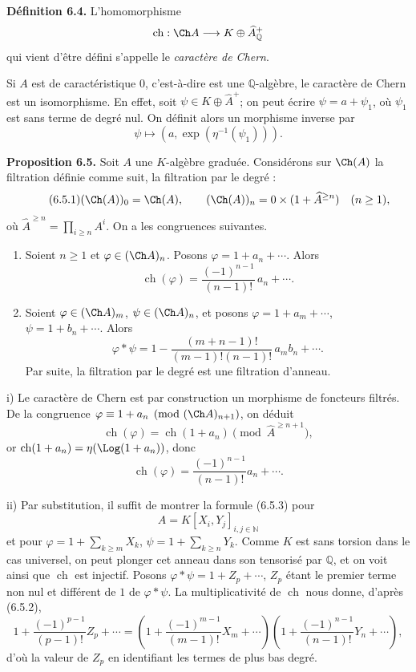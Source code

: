 \documentclass[11pt]{article}
\newcommand{\ch}{\operatorname{ch}}
\providecommand{\ch}{\operatorname{ch}}
\begin{document}
\textbf{Définition 6.4.} L'homomorphisme
\[
  \ch:\Ch A\longrightarrow K\oplus\widehat A_{\mathbb Q}^{+}
\]
qui vient d'être défini s'appelle le \emph{caractère de Chern}.

Si \(A\) est de caractéristique \(0\), c'est-à-dire est une \(\mathbb Q\)-algèbre, le caractère de Chern est un isomorphisme. En effet, soit \(\psi\in K\oplus\widehat A^+\); on peut écrire \(\psi=a+\psi_1\), où \(\psi_1\) est sans terme de degré nul. On définit alors un morphisme inverse par
\[
  \psi\longmapsto (a,\exp(\eta^{-1}(\psi_1))).
\]

\textbf{Proposition 6.5.} Soit \(A\) une \(K\)-algèbre graduée. Considérons sur \(\Ch(A)\) la filtration définie comme suit, la filtration par le degré :
\begin{equation}\tag{6.5.1}
  (\Ch(A))_0=\Ch(A),\qquad
  (\Ch(A))_n=0\times(1+\widehat A^{\ge n})\quad(n\ge1),
\end{equation}
où \(\widehat A^{\ge n}=\prod_{i\ge n}A^i\). On a les congruences suivantes.

\begin{enumerate}[label=\roman*)]
\item Soient \(n\ge1\) et \(\varphi\in(\Ch A)_n\). Posons \(\varphi=1+a_n+\cdots\). Alors
\begin{equation}\tag{6.5.2}
  \ch(\varphi)=\frac{(-1)^{n-1}}{(n-1)!}\,a_n+\cdots .
\end{equation}

\item Soient \(\varphi\in(\Ch A)_m\), \(\psi\in(\Ch A)_n\), et posons
\(\varphi=1+a_m+\cdots\), \(\psi=1+b_n+\cdots\). Alors
\begin{equation}\tag{6.5.3}
  \varphi*\psi
  =
  1-\frac{(m+n-1)!}{(m-1)!(n-1)!}\,a_m b_n+\cdots .
\end{equation}
Par suite, la filtration par le degré est une filtration d'anneau.
\end{enumerate}

i) Le caractère de Chern est par construction un morphisme de foncteurs filtrés. De la congruence \(\varphi\equiv1+a_n\pmod{(\Ch A)_{n+1}}\), on déduit
\[
  \ch(\varphi)=\ch(1+a_n)\pmod{\widehat A^{\ge n+1}},
\]
or \(\ch(1+a_n)=\eta(\Log(1+a_n))\), donc
\[
  \ch(\varphi)=\frac{(-1)^{n-1}}{(n-1)!}a_n+\cdots .
\]

ii) Par substitution, il suffit de montrer la formule (6.5.3) pour
\[
 A=K[X_i,Y_j]_{i,j\in\mathbb N}
\]
et pour \(\varphi=1+\sum_{k\ge m}X_k\), \(\psi=1+\sum_{k\ge n}Y_k\). Comme \(K\) est sans torsion dans le cas universel, on peut plonger cet anneau dans son tensorisé par \(\mathbb Q\), et on voit ainsi que \(\ch\) est injectif. Posons \(\varphi*\psi=1+Z_p+\cdots\), \(Z_p\) étant le premier terme non nul et différent de \(1\) de \(\varphi*\psi\). La multiplicativité de \(\ch\) nous donne, d'après (6.5.2),
\[
  1+\frac{(-1)^{p-1}}{(p-1)!}Z_p+\cdots
  =
  \left(1+\frac{(-1)^{m-1}}{(m-1)!}X_m+\cdots\right)
  \left(1+\frac{(-1)^{n-1}}{(n-1)!}Y_n+\cdots\right),
\]
d'où la valeur de \(Z_p\) en identifiant les termes de plus bas degré.
\end{document}
